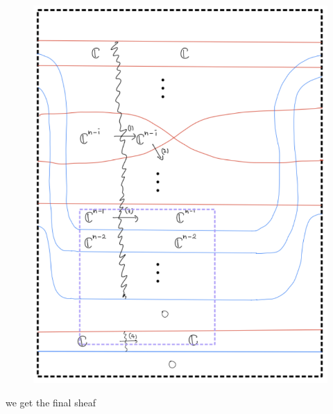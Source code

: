 \begin{enumerate}[label = (\roman*)]
\begin{enumerate}[label = (Case \arabic*)]
\begin{enumerate}[label = (Step \arabic*)]
\begin{figure}[H]
    \centering
    \includegraphics[scale = 0.95]{diagrams/cobord_gen/7.png}
    \caption{}
    \label{fig:your-label}
\end{figure}

we get the final sheaf


\end{enumerate}
\end{enumerate}
\end{enumerate}
